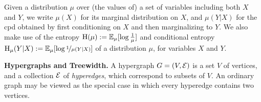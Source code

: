\documentclass{article}
\begin{document}
Given a distribution $\mu$ over (the values of) a set of variables including both $X$ and $Y$,
we write $\mu(X)$ for its marginal distribution on $X$,
and $\mu(Y|X)$ for the cpd obtained by first conditioning on $X$ and then marginalizing to $Y$.
We also make use of the entropy $\operatorname{\mathrm{H}}(\mu) := \operatorname*{\mathbb{E}}_{\mu} [\log \frac1\mu]$ and conditional entropy $\operatorname{\mathrm{H}}_\mu(Y|X) := \operatorname*{\mathbb{E}}_\mu[\log\nicefrac1{\mu(Y|X)}]$ of a distribution $\mu$,
for variables $X$ and $Y$.



\textbf{Hypergraphs and Treewidth.} \label{sec:tw}
A hypergraph $G = (V, \mathcal E)$ is a set $V$ of vertices, and a collection $\mathcal E$ of \emph{hyperedges}, which correspond to subsets of $V$.
An ordinary graph may be viewed as the special case in which every hyperedge contains  two vertices.
\end{document}
